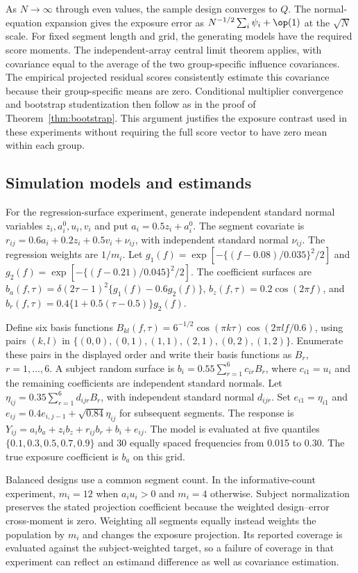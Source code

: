 As $N\to\infty$ through even values, the sample design converges to $Q$. The normal-equation expansion gives the exposure error as $N^{-1/2}\sum_i\psi_i+\op(1)$ at the $\sqrt N$ scale. For fixed segment length and grid, the generating models have the required score moments. The independent-array central limit theorem applies, with covariance equal to the average of the two group-specific influence covariances. The empirical projected residual scores consistently estimate this covariance because their group-specific means are zero. Conditional multiplier convergence and bootstrap studentization then follow as in the proof of Theorem~\ref{thm:bootstrap}. This argument justifies the exposure contrast used in these experiments without requiring the full score vector to have zero mean within each group.

\subsection{Simulation models and estimands}
For the regression-surface experiment, generate independent standard normal variables $z_i,a_i^0,u_i,v_i$ and put $a_i=0.5z_i+a_i^0$. The segment covariate is $r_{ij}=0.6a_i+0.2z_i+0.5v_i+\nu_{ij}$, with independent standard normal $\nu_{ij}$. The regression weights are $1/m_i$. Let $g_1(f)=\exp[-\{(f-0.08)/0.035\}^2/2]$ and $g_2(f)=\exp[-\{(f-0.21)/0.045\}^2/2]$. The coefficient surfaces are $b_a(f,\tau)=\delta(2\tau-1)^2\{g_1(f)-0.6g_2(f)\}$, $b_z(f,\tau)=0.2\cos(2\pi f)$, and $b_r(f,\tau)=0.4\{1+0.5(\tau-0.5)\}g_2(f)$.

Define six basis functions $B_{kl}(f,\tau)=6^{-1/2}\cos(\pi k\tau)\cos(2\pi lf/0.6)$, using pairs $(k,l)$ in $\{(0,0),(0,1),(1,1),(2,1),(0,2),(1,2)\}$. Enumerate these pairs in the displayed order and write their basis functions as $B_r$, $r=1,\ldots,6$. A subject random surface is $b_i=0.55\sum_{r=1}^6c_{ir}B_r$, where $c_{i1}=u_i$ and the remaining coefficients are independent standard normals. Let $\eta_{ij}=0.35\sum_{r=1}^6d_{ijr}B_r$, with independent standard normal $d_{ijr}$. Set $e_{i1}=\eta_{i1}$ and $e_{ij}=0.4e_{i,j-1}+\sqrt{0.84}\eta_{ij}$ for subsequent segments. The response is $Y_{ij}=a_i b_a+z_i b_z+r_{ij}b_r+b_i+e_{ij}$. The model is evaluated at five quantiles $\{0.1,0.3,0.5,0.7,0.9\}$ and 30 equally spaced frequencies from 0.015 to 0.30. The true exposure coefficient is $b_a$ on this grid.

Balanced designs use a common segment count. In the informative-count experiment, $m_i=12$ when $a_i u_i>0$ and $m_i=4$ otherwise. Subject normalization preserves the stated projection coefficient because the weighted design--error cross-moment is zero. Weighting all segments equally instead weights the population by $m_i$ and changes the exposure projection. Its reported coverage is evaluated against the subject-weighted target, so a failure of coverage in that experiment can reflect an estimand difference as well as covariance estimation.

